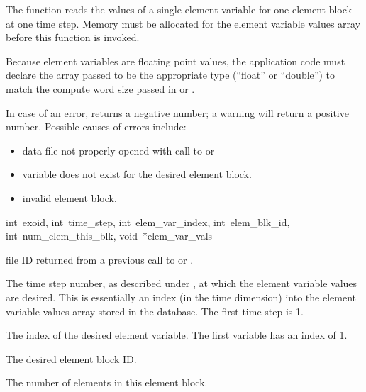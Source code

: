 The function  reads the values of a single
element variable for one element block at one time step. Memory must
be allocated for the element variable values array before this
function is invoked.

Because element variables are floating point values, the application
code must declare the array passed to be the appropriate type
(``float'' or ``double'') to match the compute word size passed in
 or .


In case of an error,  returns a negative
number; a warning will return a positive number. Possible causes of
errors include:

\begin{itemize}
 \item data file not properly opened with call to 
 or 

 \item variable does not exist for the desired element block.

 \item invalid element block.
\end{itemize}

{int~exoid, 
int~time_step, 
int~elem_var_index,
int~elem_blk_id, 
int~num_elem_this_blk, 
void~*elem_var_vals}

\begin{parameters}
\item[{int exoid \R{}}]
\exo{} file ID returned from a previous call to  or
.

\item[{int time_step \R{}}]
The time step number, as described under , at
which the element variable values are desired. This is essentially an
index (in the time dimension) into the element variable values array
stored in the database. The first time step is 1.

\item[{int elem_var_index \R{}}]
The index of the desired element variable. The first variable 
has an index of 1.

\item[{int elem_blk_id \R{}}]
The desired element block ID.

\item[{int num_elem_this_blk \R{}}]
The number of elements in this element block.
\end{parameters}

